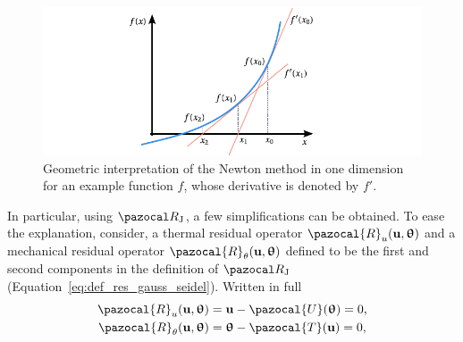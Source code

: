 \begin{figure}[htbp]
  \includegraphics{figures/newton_method}
  \caption{Geometric interpretation of the Newton method in one dimension for an example function \(f\), whose derivative is denoted by \(f'\).}
  \label{fig:newton_method}
\end{figure}

In particular, using \(\pazocal R_\mathrm{J}\), a few simplifications can be obtained.
To ease the explanation, consider, a thermal residual operator $\pazocal{R}_{u}(\mathbf{u}, \bm{\uptheta})$ and a mechanical residual operator $\pazocal{R}_{\theta}(\mathbf{u}, \bm{\uptheta})$ defined to be the first and second components in the definition of \(\pazocal R_\mathrm{J}\) (Equation~\eqref{eq:def_res_gauss_seidel}).
Written in full
\begin{gather}
\pazocal{R}_{u}(\mathbf{u}, \bm{\uptheta})=\mathbf{u}-\pazocal{U}(\bm{\uptheta})=0, \\
\pazocal{R}_{\theta}(\mathbf{u}, \bm{\uptheta})=\bm{\uptheta}-\pazocal{T}(\mathbf{u})=0,
\end{gather}

